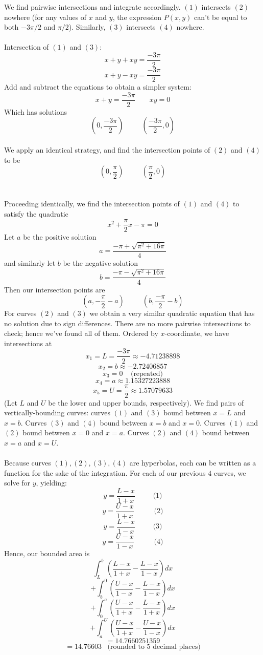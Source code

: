 \documentclass[12pt]{article}
\begin{document}
We find pairwise intersections and integrate accordingly. $(1)$ intersects $(2)$ nowhere (for any values of $x$ and $y$, the expression $P(x,y)$ can't be equal to both $-3\pi/2$ and $\pi/2$). Similarly, $(3)$ intersects $(4)$ nowhere. \\ \\ Intersection of $(1)$ and $(3)$: $$x + y + xy = \frac{-3\pi}{2}$$ $$x + y - xy = \frac{-3\pi}{2}$$ Add and subtract the equations to obtain a simpler system: $$x + y = \frac{-3\pi}{2} \;\;\;\;\;\;\; xy = 0$$ Which has solutions $$\left(0, \frac{-3\pi}{2}\right) \;\;\;\;\;\;\;\;\; \left(\frac{-3\pi}{2}, 0\right)$$ \\
We apply an identical strategy, and find the intersection points of $(2)$ and $(4)$ to be $$\left(0, \frac{\pi}{2}\right) \;\;\;\;\;\;\;\;\;  \left(\frac{\pi}{2}, 0\right)$$ \\ \\ Proceeding identically, we find the intersection points of $(1)$ and $(4)$ to satisfy the quadratic $$x^2 + \frac{\pi}{2} x - \pi = 0$$ Let $a$ be the positive solution $$a = \frac{-\pi + \sqrt{\pi^2 + 16\pi}}{4}$$ and similarly let $b$ be the negative solution $$b = \frac{-\pi - \sqrt{\pi^2 + 16\pi}}{4}$$ Then our intersection points are $$\left(a, -\frac{\pi}{2} - a\right) \;\;\;\;\;\;\;\;\; \left(b, \frac{-\pi}{2} - b\right)$$ For curves $(2)$ and $(3)$ we obtain a very similar quadratic equation that has no solution due to sign differences. There are no more pairwise intersections to check; hence we've found all of them. Ordered by $x$-coordinate, we have intersections at $$x_1 = L = \frac{-3\pi}{2} \approx -4.71238898$$ $$x_2 = b \approx -2.72406857$$ $$x_3 = 0 \;\;\;\; \text{(repeated)}$$ $$x_4 = a \approx 1.15327223888$$ $$x_5 = U = \frac{\pi}{2} \approx 1.57079633$$ (Let $L$ and $U$ be the lower and upper bounds, respectively). We find pairs of vertically-bounding curves: curves $(1)$ and $(3)$ bound between $x=L$ and $x=b$. Curves $(3)$ and $(4)$ bound between $x=b$ and $x=0$. Curves $(1)$ and $(2)$ bound between $x=0$ and $x=a$. Curves $(2)$ and $(4)$ bound between $x=a$ and $x=U$. \\ \\ Because curves $(1),(2),(3),(4)$ are hyperbolas, each can be written as a function for the sake of the integration. For each of our previous $4$ curves, we solve for $y$, yielding:
$$y = \frac{L - x}{1 + x} \;\;\;\;\;\;\;\;\; \text{(1)}$$
$$y = \frac{U-x}{1 + x} \;\;\;\;\;\;\;\;\;\; \text{(2)}$$
$$y = \frac{L - x}{1 - x} \;\;\;\;\;\;\;\;\; \text{(3)}$$
$$y = \frac{U - x}{1 - x} \;\;\;\;\;\;\;\;\;\; \text{(4)}$$
Hence, our bounded area is $$\int_L^b \left(\frac{L-x}{1+x} - \frac{L-x}{1-x}\right)dx$$
$$ + \int_b^0 \left(\frac{U-x}{1-x} - \frac{L-x}{1-x}\right)dx$$
$$ + \int_0^a \left(\frac{U-x}{1 + x} - \frac{L - x}{1 + x}\right)dx$$
$$ + \int_a^U \left(\frac{U-x}{1 + x} - \frac{U - x}{1 - x}\right)dx$$
$$ = 14.7660251359$$
$$ = 14.76603 \;\;\; \text{(rounded to 5 decimal places)}$$
\vspace{0.1in}
\end{document}
